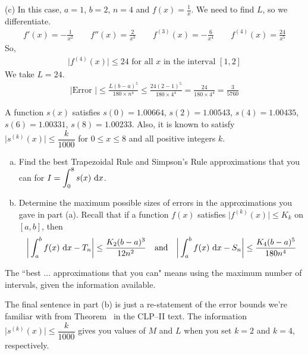 \begin{solution}
\noindent (c)
In this case, $a=1$, $b=2$,
$n=4$ and $f(x)=\frac{1}{x}$. We need to find $L$, so we differentiate.
\begin{align*}
f'(x)=-\frac{1}{x^2}\qquad
f''(x)=\frac{2}{x^3}\qquad
f^{(3)}(x)=-\frac{6}{x^4}\qquad
f^{(4)}(x)=\frac{24}{x^5}
\end{align*}
So,
\begin{align*}
\big|f^{(4)}(x)\big|\le 24\text{ for all }x\text{ in the interval } [1,2]
\end{align*}
We take $L=24$.
\begin{align*}
|\text{Error }|\le \frac{L(b-a)^5}{180\times n^4}
\le \frac{24(2-1)^5}{180\times 4^4}=\frac{24}{180\times 4^4}=\frac{3}{5760}
\end{align*}


\end{solution}


\begin{question}[M121 2000A]\label{prob_s.1.11_error2}
A function $s(x)$ satisfies $s(0)=1.00664$, $s(2)=1.00543$,
$s(4)=1.00435$, $s(6)=1.00331$, $s(8)=1.00233$. Also, it is known to satisfy
$\big|s^{(k)}(x)\big|\le \dfrac{k}{1000}$ for $0\le x\le 8$ and all positive
integers $k$.

\begin{enumerate}[(a)]
\item
Find the best Trapezoidal Rule and Simpson's Rule approximations
that you can for $\displaystyle I=\int_0^8 s(x)\ \mathrm{d}x$.

\item
Determine the maximum possible sizes of errors in the approximations
you gave in part (a). Recall that if a function $f(x)$ satisfies
$\big|f^{(k)}(x)\big|\le K_k$ on $[a,b]$, then
\begin{equation*}
\bigg|\int_a^b f(x)\ \mathrm{d}x -T_n\bigg|\le \frac{K_2(b-a)^3}{12n^2}
\quad\hbox{and}\quad
\bigg|\int_a^b f(x)\ \mathrm{d}x -S_n\bigg|\le \frac{K_4(b-a)^5}{180n^4}
\end{equation*}
\end{enumerate}
\end{question}

\begin{hint}
The ``best ... approximations that you can" means using the maximum number of intervals, given the information available.

The final sentence in part (b) is just a re-statement of the error bounds we're familiar with from Theorem~ in the CLP--II text. The information $\big|s^{(k)}(x)\big|\le \dfrac{k}{1000}$ gives you values of $M$ and $L$ when you set $k=2$ and $k=4$, respectively.
\end{hint}

